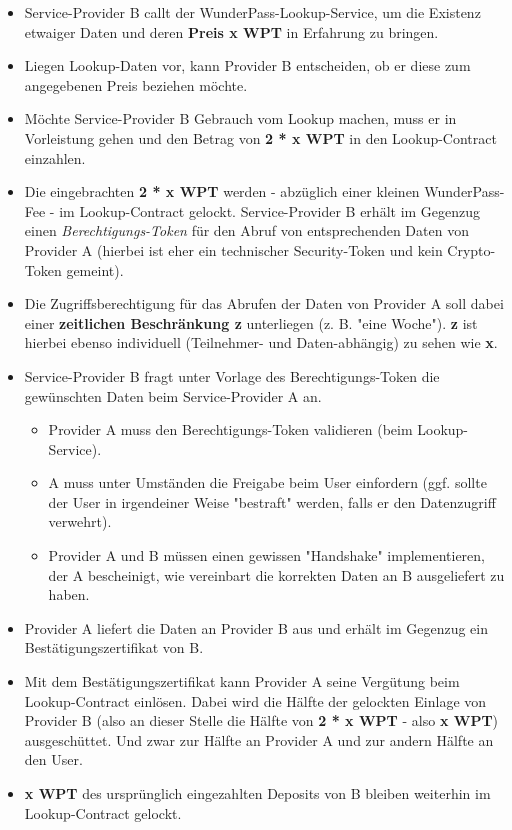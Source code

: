 \begin{Solution}
\begin{itemize}
\begin{itemize}
  \end{itemize}
  \item Service-Provider B callt der WunderPass-Lookup-Service, um die Existenz etwaiger Daten und deren \textbf{Preis x WPT} in Erfahrung zu bringen.
  \item Liegen Lookup-Daten vor, kann Provider B entscheiden, ob er diese zum angegebenen Preis beziehen möchte. 
  \item Möchte Service-Provider B Gebrauch vom Lookup machen, muss er in Vorleistung gehen und den Betrag von \textbf{2 * x WPT} in den Lookup-Contract einzahlen.
  \item Die eingebrachten \textbf{2 * x WPT} werden - abzüglich einer kleinen WunderPass-Fee - im Lookup-Contract gelockt. Service-Provider B erhält im Gegenzug einen \textit{Berechtigungs-Token} für den Abruf von entsprechenden Daten von Provider A (hierbei ist eher ein technischer Security-Token und kein Crypto-Token gemeint).
  \item Die Zugriffsberechtigung für das Abrufen der Daten von Provider A soll dabei einer \textbf{zeitlichen Beschränkung z} unterliegen (z. B. "eine Woche"). \textbf{z} ist hierbei ebenso individuell (Teilnehmer- und Daten-abhängig) zu sehen wie \textbf{x}.
  \item Service-Provider B fragt unter Vorlage des Berechtigungs-Token die gewünschten Daten beim Service-Provider A an.
  \begin{itemize}
  	\item Provider A muss den Berechtigungs-Token validieren (beim Lookup-Service).
  	\item A muss unter Umständen die Freigabe beim User einfordern (ggf. sollte der User in irgendeiner Weise "bestraft" werden, falls er den Datenzugriff verwehrt).
  	\item Provider A und B müssen einen gewissen "Handshake" implementieren, der A bescheinigt, wie vereinbart die korrekten Daten an B ausgeliefert zu haben. 
  \end{itemize}
  \item Provider A liefert die Daten an Provider B aus und erhält im Gegenzug ein Bestätigungszertifikat von B.
  \item Mit dem Bestätigungszertifikat kann Provider A seine Vergütung beim Lookup-Contract einlösen. Dabei wird die Hälfte der gelockten Einlage von Provider B (also an dieser Stelle die Hälfte von \textbf{2 * x WPT} - also \textbf{x WPT}) ausgeschüttet. Und zwar zur Hälfte an Provider A und zur andern Hälfte an den User.
  \item \textbf{x WPT} des ursprünglich eingezahlten Deposits von B bleiben weiterhin im Lookup-Contract gelockt. 

\end{itemize}
\end{Solution}
